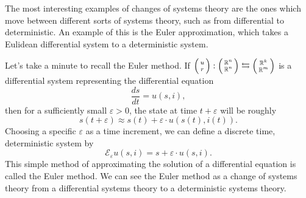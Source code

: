\documentclass[DynamicalBook]{subfiles}
\begin{document}
The most interesting examples of changes of systems theory are the ones which move
between different sorts of systems theory, such as from differential to deterministic.
An example of this is the Euler approximation, which takes a Eulidean
differential system to a deterministic system.

Let's take a minute to recall the Euler method. If $\lens{u}{r} : \lens{\rr^n}{\rr^n} \fromto \lens{\rr^k}{\rr^m}$
is a differential system representing the differential equation
$$\frac{ds}{dt} = u(s, i),$$
then for a sufficiently small $\varepsilon > 0$, the state at time $t + \varepsilon$
will be roughly
$$s(t + \varepsilon) \approx s(t) + \varepsilon \cdot u(s(t), i(t)).$$
Choosing a specific $\varepsilon$ as a time increment, we can define a discrete
time, deterministic system by
\begin{equation}\label{eqn:euler.method.equation}
\mathcal{E}_{\varepsilon}u(s, i) = s + \varepsilon \cdot u(s, i).
\end{equation}
This simple method of approximating the solution of a differential equation is
called the Euler method. We can see the Euler method as a change of systems theory
from a differential systems theory to a deterministic systems theory.
\end{document}
